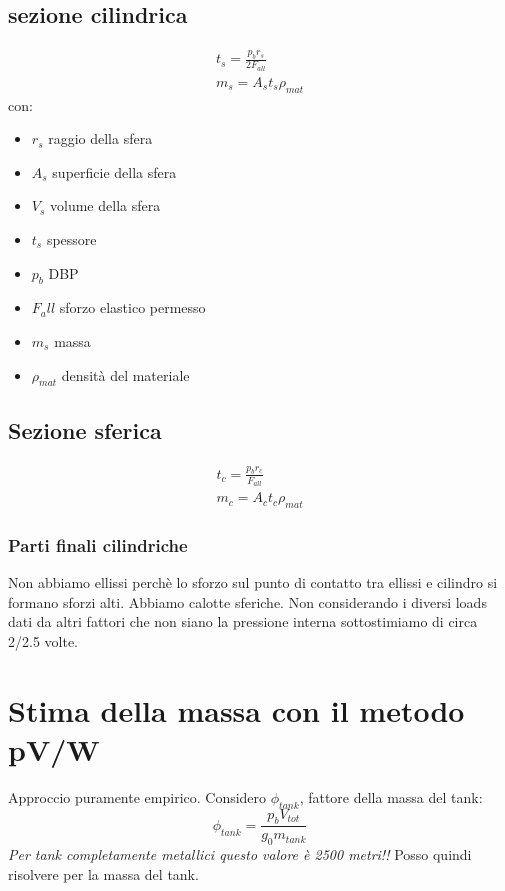 \documentclass[a4paper]{article}
\begin{document}
    \subsection{sezione cilindrica}
    \begin{eqnarray*}
        t_s = \frac{p_b r_s}{2 F_{all}}\\
        m_s = A_s t_s \rho_{mat}
    \end{eqnarray*}
    con: 
    \begin{itemize}
        \item $r_s$ raggio della sfera
        \item $A_s$ superficie della sfera
        \item $V_s$ volume della sfera
        \item $t_s$ spessore
        \item $p_b$ DBP
        \item $F_all$ sforzo elastico permesso
        \item $m_s$ massa
        \item $\rho_{mat}$ densità del materiale
    \end{itemize}
    \subsection{Sezione sferica}
    \begin{eqnarray*}
        t_c = \frac{p_b r_c}{F_{all}}\\
        m_c = A_c t_c \rho_{mat}
    \end{eqnarray*}
    \subsubsection{Parti finali cilindriche}
    Non abbiamo ellissi perchè lo sforzo sul punto di contatto tra 
    ellissi e cilindro si formano sforzi alti. Abbiamo calotte sferiche.
    Non considerando i diversi loads dati da altri fattori che non siano la 
    pressione interna sottostimiamo di circa 2/2.5 volte.
    \section{Stima della massa con il metodo pV/W}
    Approccio puramente empirico. Considero $\phi_{tank}$, fattore della massa del tank:
    \begin{equation*}
        \phi_{tank} = \frac{p_b V_{tot}}{g_0 m_{tank}}
    \end{equation*}
    \emph{Per tank completamente metallici questo valore è 2500 metri!!}
    Posso quindi risolvere per la massa del tank.
\end{document}
